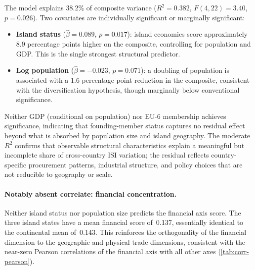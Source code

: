 The model explains 38.2\% of composite variance ($R^2 = 0.382$,
$F(4,22) = 3.40$, $p = 0.026$).  Two covariates are individually
significant or marginally significant:
\begin{itemize}[leftmargin=2em]
  \item \textbf{Island status} ($\hat{\beta} = 0.089$,
    $p = 0.017$): island economies score approximately 8.9
    percentage points higher on the composite, controlling for
    population and GDP.  This is the single strongest structural
    predictor.
  \item \textbf{Log population} ($\hat{\beta} = -0.023$,
    $p = 0.071$): a doubling of population is associated with a
    1.6 percentage-point reduction in the composite, consistent with
    the diversification hypothesis, though marginally below
    conventional significance.
\end{itemize}
Neither GDP (conditional on population) nor EU-6 membership achieves
significance, indicating that founding-member status captures no
residual effect beyond what is absorbed by population size and
island geography.  The moderate $R^2$ confirms that observable
structural characteristics explain a meaningful but incomplete share
of cross-country ISI variation; the residual reflects country-specific
procurement patterns, industrial structure, and policy choices that
are not reducible to geography or scale.

\paragraph{Notably absent correlate: financial concentration.}
Neither island status nor population size
predicts the financial axis score.  The three island states
have a mean financial score of~0.137, essentially identical to the
continental mean of~0.143.  This reinforces the orthogonality of the
financial dimension to the geographic and physical-trade dimensions,
consistent with the near-zero Pearson correlations of the financial
axis with all other axes (\cref{tab:corr-pearson}).
